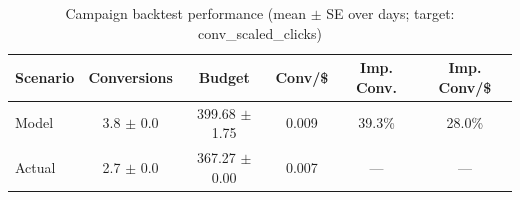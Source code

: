 \begin{table}[htbp]
\centering
\caption{Campaign backtest performance (mean $\pm$ SE over days; target: conv_scaled_clicks)}
\begin{tabular}{lccccc}
\toprule
Scenario & Conversions & Budget & Conv/\$ & Imp. Conv. & Imp. Conv/\$ \\
\midrule
Model & 3.8 $\pm$ 0.0 & 399.68 $\pm$ 1.75 & 0.009 & 39.3\% & 28.0\% \\
Actual & 2.7 $\pm$ 0.0 & 367.27 $\pm$ 0.00 & 0.007 & --- & --- \\
\bottomrule
\end{tabular}

\end{table}

